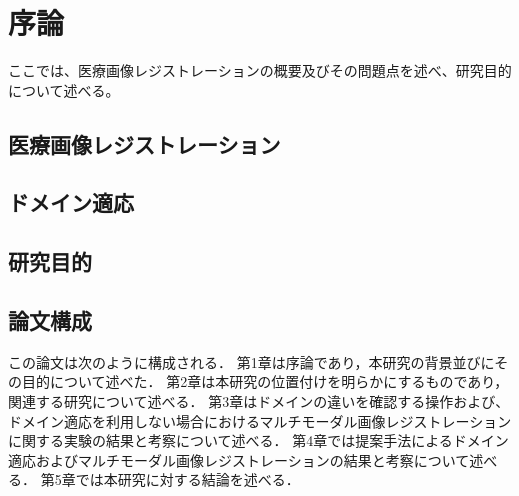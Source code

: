 \chapter{序論}
\thispagestyle{fancy} %


ここでは、医療画像レジストレーションの概要及びその問題点を述べ、研究目的について述べる。

\section{医療画像レジストレーション}
    

\section{ドメイン適応}
    

\section{研究目的}
    

\section{論文構成}
    この論文は次のように構成される．
    第1章は序論であり，本研究の背景並びにその目的について述べた．
    第2章は本研究の位置付けを明らかにするものであり，関連する研究について述べる．
    第3章はドメインの違いを確認する操作および、ドメイン適応を利用しない場合におけるマルチモーダル画像レジストレーションに関する実験の結果と考察について述べる．
    第4章では提案手法によるドメイン適応およびマルチモーダル画像レジストレーションの結果と考察について述べる．
    第5章では本研究に対する結論を述べる．